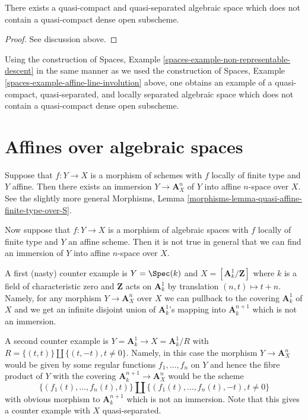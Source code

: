 \begin{lemma}
\label{lemma-nonexistence-qc-dense-open-subscheme}
There exists a quasi-compact and quasi-separated algebraic space
which does not contain a quasi-compact dense open subscheme.
\end{lemma}

\begin{proof}
See discussion above.
\end{proof}

\noindent
Using the construction of 
Spaces, Example \ref{spaces-example-non-representable-descent}
in the same manner as we used the construction of
Spaces, Example \ref{spaces-example-affine-line-involution}
above, one obtains an example of a quasi-compact, quasi-separated, and
locally separated algebraic space which does not contain a quasi-compact
dense open subscheme.


\section{Affines over algebraic spaces}
\label{section-embedding-affines}

\medskip\noindent
Suppose that $f : Y \to X$ is a morphism of schemes with $f$
locally of finite type and $Y$ affine. Then there exists an immersion
$Y \to \mathbf{A}^n_X$ of $Y$ into affine $n$-space over $X$.
See the slightly more general
Morphisms, Lemma \ref{morphisms-lemma-quasi-affine-finite-type-over-S}.

\medskip\noindent
Now suppose that $f : Y \to X$ is a morphism of algebraic spaces with
$f$ locally of finite type and $Y$ an affine scheme. Then it is not
true in general that we can find an immersion of $Y$ into affine
$n$-space over $X$.

\medskip\noindent
A first (nasty) counter example is $Y = \Spec(k)$ and
$X = [\mathbf{A}^1_k/\mathbf{Z}]$ where $k$ is a field of characteristic zero
and $\mathbf{Z}$ acts on $\mathbf{A}^1_k$ by translation $(n, t) \mapsto t + n$.
Namely, for any morphism $Y \to \mathbf{A}^n_X$ over $X$ we can pullback to
the covering $\mathbf{A}^1_k$ of $X$ and we get an infinite disjoint union of
$\mathbf{A}^1_k$'s mapping into $\mathbf{A}^{n + 1}_k$ which is not an
immersion.

\medskip\noindent
A second counter example is $Y = \mathbf{A}^1_k \to X = \mathbf{A}^1_k/R$
with $R = \{(t, t)\} \amalg \{(t, -t), t \not = 0\}$. Namely, in
this case the morphism $Y \to \mathbf{A}^n_X$ would be given by some
regular functions $f_1, \ldots, f_n$ on $Y$ and hence the
fibre product of $Y$ with the covering
$\mathbf{A}^{n + 1}_k \to \mathbf{A}^n_X$
would be the scheme
$$
\{(f_1(t), \ldots, f_n(t), t)\} \amalg
\{(f_1(t), \ldots, f_n(t), -t), t \not = 0\}
$$
with obvious morphism to $\mathbf{A}^{n + 1}_k$ which is not an immersion.
Note that this gives a counter example with $X$ quasi-separated.

